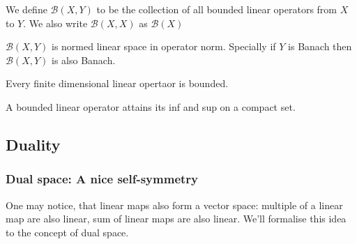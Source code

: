 \begin{definition}[$\mathscr B$]\rm\nextline
	We define $\mathscr B(X,Y)$ to be the collection of all bounded linear operators from $X$ to $Y$. We also write $\mathscr B(X,X)$ as $\mathscr B(X)$
\end{definition}

\begin{proposition}\rm\nextline
	$\mathscr B(X,Y)$ is normed linear space in operator norm. Specially if $Y$ is Banach then $\mathscr B(X,Y)$ is also Banach.
\end{proposition}

\begin{theorem}\rm\nextline
	Every finite dimensional linear opertaor is bounded.
\end{theorem}

\begin{theorem}\rm\nextline
	A bounded linear operator attains its inf and sup on  a compact set.
\end{theorem}

\subsection{Duality}

\subsubsection{Dual space: A nice self-symmetry}
One may notice, that linear maps also form a vector space: multiple of a linear map are also linear, sum of linear maps are also linear. We'll formalise this idea to the concept of dual space.

